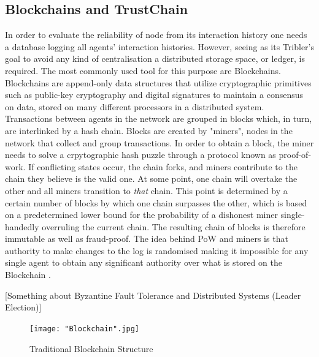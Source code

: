 \documentclass[11pt,a4paper]{article}
\theoremstyle{definition}
\theoremstyle{theorem}
\theoremstyle{proposition}
\theoremstyle{corollary}
\theoremstyle{lemma}
\theoremstyle{example}
\theoremstyle{remark}
\begin{document}
\subsection{Blockchains and TrustChain}
\label{subsec:Blockchains and TrustChain}
\noindent{}In order to evaluate the reliability of node from its interaction history one needs a database logging all agents' interaction histories. However, seeing as its Tribler's goal to avoid any kind of centralisation a distributed storage space, or ledger, is required. The most commonly used tool for this purpose are Blockchains. Blockchains are append-only data structures that utilize cryptographic primitives such as public-key cryptography and digital signatures to maintain a consensus on data, stored on many different processors in a distributed system. Transactions between agents in the network are grouped in blocks which, in turn, are interlinked by a hash chain. Blocks are created by "miners", nodes in the network that collect and group transactions. In order to obtain a block, the miner needs to solve a crpytographic hash puzzle through a protocol known as proof-of-work. If conflicting states occur, the chain forks, and miners contribute to the chain they believe is the valid one. At some point, one chain will overtake the other and all miners transition to {\it that} chain. This point is determined by a certain number of blocks by which one chain surpasses the other, which is based on a predetermined lower bound for the probability of a dishonest miner single-handedly overruling the current chain. The resulting chain of blocks is therefore immutable as well as fraud-proof. The idea behind PoW and miners is that authority to make changes to the log is randomised making it impossible for any single agent to obtain any significant authority over what is stored on the Blockchain \cite{Bitcoin: A peer-to-peer electronic cash system}. \vspace{1em}\\

\begin{center}[Something about Byzantine Fault Tolerance and Distributed Systems (Leader Election)]\vspace{1em}\\\end{center}

\begin{figure}[H]
\begin{center}
\texttt{[image: "Blockchain".jpg]}
\caption{Traditional Blockchain Structure}
\label{fig:Blockchain}
\end{center}
\end{figure}
\end{document}
